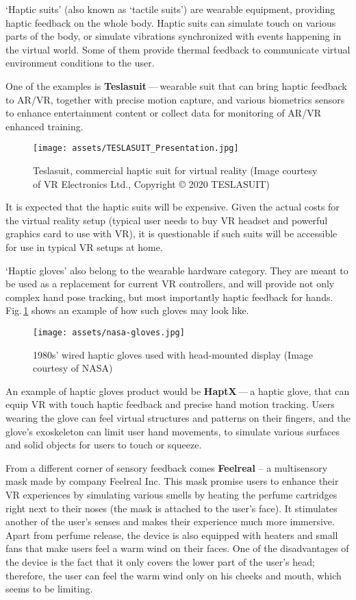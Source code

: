 `Haptic suits' (also known as `tactile suits') are wearable
equipment, providing haptic feedback on the whole body. Haptic suits can 
simulate touch on various parts of the body, or simulate
vibrations synchronized with events happening in the virtual world. Some
of them provide thermal feedback to communicate virtual environment
conditions to the user.

One of the examples is \textbf{Teslasuit} — wearable suit that can bring
haptic feedback to AR/VR, together with precise motion capture, 
and various biometrics sensors to
enhance entertainment content or collect data for monitoring of
AR/VR enhanced training.\,\cite{teslasuitab}

\begin{figure}[h]{}
\centering\texttt{[image: assets/TESLASUIT\_Presentation.jpg]}
\caption{Teslasuit, commercial haptic suit for virtual reality (Image courtesy of VR Electronics Ltd., Copyright © 2020 TESLASUIT)}
\end{figure}

It is expected that the haptic suits will be expensive. Given the actual costs 
for the virtual reality setup (typical user needs to buy VR headset and 
powerful graphics card to use with VR), 
it is questionable if such suits will be
accessible for use in typical VR setups at home.

\pagebreak


`Haptic gloves' also belong to the wearable hardware category. 
They are meant to be used as a replacement for current VR controllers, 
and will provide not only
complex hand pose tracking, but most importantly haptic feedback for hands.
Fig.\,\ref{gloves} shows an example of how such gloves may look like.

\begin{figure}[h]{}
    \centering\texttt{[image: assets/nasa-gloves.jpg]}
    \caption{1980s' wired haptic gloves used with head-mounted display (Image courtesy of NASA)}
    \label{gloves}
\end{figure}

An example of haptic gloves product would be \textbf{HaptX} — a haptic
glove, that can equip VR with touch haptic feedback and precise
hand motion tracking. Users wearing the glove can feel virtual structures
and patterns on their fingers, and the glove’s exoskeleton can limit user
hand movements, to simulate various surfaces and solid objects for users to
touch or squeeze.\,\cite{haptxtech}

From a different corner of sensory feedback comes \textbf{Feelreal} 
-- a multisensory mask made by company Feelreal Inc. This mask promise users to enhance
their VR experiences by simulating various smells by heating the perfume
cartridges right next to their noses (the mask is attached to the user’s face).
It stimulates another of the user’s senses and makes their
experience much more immersive. Apart from perfume release, the device is
also equipped with heaters and small fans that make users feel a warm
wind on their faces. One of the disadvantages of the device is the fact that
it only covers the lower part of the user’s head; therefore, the user can feel
the warm wind only on his cheeks and mouth, which seems to be limiting.